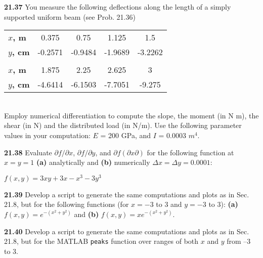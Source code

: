 \documentclass[../main.tex]{subfiles}
\begin{document}
\begin{multicols}{2}
\textbf{21.37} You measure the following deflections along the
length of a simply supported uniform beam (see Prob. 21.36)\\
\begin{tabular}{lcccc}
	\hline

	\textbf{$x$, m} \; 0 &  0.375 & 0.75 & 1.125 & 1.5\\

	\textbf{$y$, cm} \; 0 & -0.2571 & -0.9484 & -1.9689 & -3.2262\\
	
	\vspace{0,1in}\\
	
	\textbf{$x$, m} & 1.875 & 2.25 & 2.625 & 3\\
	
	\textbf{$y$, cm} & -4.6414 & -6.1503 & -7.7051 & -9.275\\

	\hline
\end{tabular}\\
Employ numerical differentiation to compute the slope, the
moment (in N m), the shear (in N) and the distributed load
(in N/m). Use the following parameter values in your computation: $E$ = 200 GPa, and $I$ = 0.0003 $m^4$.

\textbf{21.38} Evaluate $ \partial f/ \partial x $, $ \partial f / \partial y $, and $ \partial f (\partial x \partial ) $ for the following function at $x=y=1$ \textbf{(a)} analytically and \textbf{(b)} numerically $ \Delta x = \Delta y = 0.0001 $:

$ f(x,y) =3xy + 3x - x^3 - 3y^3 $

\textbf{21.39} Develop a script to generate the same computations
and plots as in Sec. 21.8, but for the following functions (for $ x= -3$ to 3 and $y = -3$ to 3): \textbf{(a)} $f(x,y) = e^{-(x^2+y^2)}$ and \textbf{(b)} $f(x,y) = xe^{ -(x^2+y^2) }$.

\textbf{21.40} Develop a script to generate the same computations
and plots as in Sec. 21.8, but for the MATLAB \texttt{peaks}
function over ranges of both $x$ and $y$ from –3 to 3.









\end{multicols}






	
	
	
	
\end{document}

